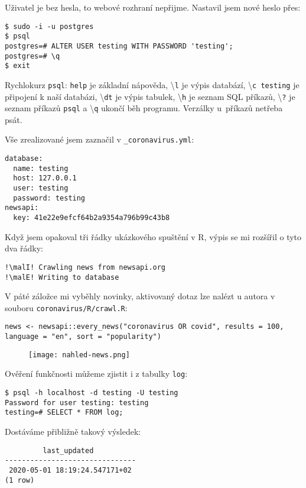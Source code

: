 Uživatel je bez hesla, to webové rozhraní nepřijme. Nastavil jsem nové heslo přes:
\begin{lstlisting}
$ sudo -i -u postgres
$ psql
postgres=# ALTER USER testing WITH PASSWORD 'testing';
postgres=# \q
$ exit
\end{lstlisting}

Rychlokurz \texttt{psql}: \texttt{help} je základní nápověda, \textbackslash\texttt{l} je výpis databází, \textbackslash\texttt{c testing} je připojení k naší databázi, \textbackslash\texttt{dt} je výpis tabulek, \textbackslash\texttt{h} je seznam SQL příkazů, \textbackslash\texttt{?} je seznam příkazů \texttt{psql} a \textbackslash\texttt{q} ukončí běh programu. Verzálky u~příkazů netřeba psát.


Vše zrealizované jsem zaznačil v \texttt{\_coronavirus.yml}:
\begin{lstlisting}
database:
  name: testing
  host: 127.0.0.1
  user: testing
  password: testing
newsapi:
  key: 41e22e9efcf64b2a9354a796b99c43b8
\end{lstlisting}

Když jsem opakoval tři řádky ukázkového spuštění v R, výpis se mi rozšířil o tyto dva řádky:
\begin{lstlisting}[escapechar=!]
!\malI! Crawling news from newsapi.org
!\malE! Writing to database
\end{lstlisting}


V páté záložce mi vyběhly novinky, aktivovaný dotaz lze nalézt u autora v souboru \texttt{coronavirus/R/crawl.R}:
\begin{lstlisting}
news <- newsapi::every_news("coronavirus OR covid", results = 100, language = "en", sort = "popularity")
\end{lstlisting}

\begin{figure}[!htb]
\texttt{[image: nahled-news.png]}
\end{figure}

Ověření funkčnosti můžeme zjistit i z tabulky \texttt{log}:
\begin{lstlisting}
$ psql -h localhost -d testing -U testing
Password for user testing: testing
testing=# SELECT * FROM log;
\end{lstlisting}

Dostáváme přibližně takový výsledek:
\begin{lstlisting}
         last_updated
-------------------------------
 2020-05-01 18:19:24.547171+02
(1 row)
\end{lstlisting}

